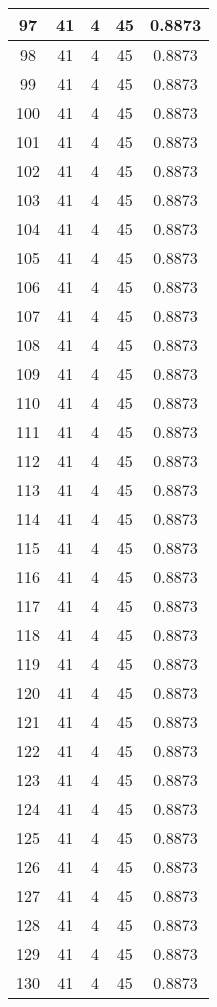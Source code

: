 \documentclass[letterpaper, 12pt]{article}
\begin{document}
\begin{longtable}{|c|c|c|c|c|}
\hline
97 & 41 & 4 & 45 & 0.8873 \\
\hline
98 & 41 & 4 & 45 & 0.8873 \\
\hline
99 & 41 & 4 & 45 & 0.8873 \\
\hline
100 & 41 & 4 & 45 & 0.8873 \\
\hline
101 & 41 & 4 & 45 & 0.8873 \\
\hline
102 & 41 & 4 & 45 & 0.8873 \\
\hline
103 & 41 & 4 & 45 & 0.8873 \\
\hline
104 & 41 & 4 & 45 & 0.8873 \\
\hline
105 & 41 & 4 & 45 & 0.8873 \\
\hline
106 & 41 & 4 & 45 & 0.8873 \\
\hline
107 & 41 & 4 & 45 & 0.8873 \\
\hline
108 & 41 & 4 & 45 & 0.8873 \\
\hline
109 & 41 & 4 & 45 & 0.8873 \\
\hline
110 & 41 & 4 & 45 & 0.8873 \\
\hline
111 & 41 & 4 & 45 & 0.8873 \\
\hline
112 & 41 & 4 & 45 & 0.8873 \\
\hline
113 & 41 & 4 & 45 & 0.8873 \\
\hline
114 & 41 & 4 & 45 & 0.8873 \\
\hline
115 & 41 & 4 & 45 & 0.8873 \\
\hline
116 & 41 & 4 & 45 & 0.8873 \\
\hline
117 & 41 & 4 & 45 & 0.8873 \\
\hline
118 & 41 & 4 & 45 & 0.8873 \\
\hline
119 & 41 & 4 & 45 & 0.8873 \\
\hline
120 & 41 & 4 & 45 & 0.8873 \\
\hline
121 & 41 & 4 & 45 & 0.8873 \\
\hline
122 & 41 & 4 & 45 & 0.8873 \\
\hline
123 & 41 & 4 & 45 & 0.8873 \\
\hline
124 & 41 & 4 & 45 & 0.8873 \\
\hline
125 & 41 & 4 & 45 & 0.8873 \\
\hline
126 & 41 & 4 & 45 & 0.8873 \\
\hline
127 & 41 & 4 & 45 & 0.8873 \\
\hline
128 & 41 & 4 & 45 & 0.8873 \\
\hline
129 & 41 & 4 & 45 & 0.8873 \\
\hline
130 & 41 & 4 & 45 & 0.8873 \\

\end{longtable}
\end{document}

